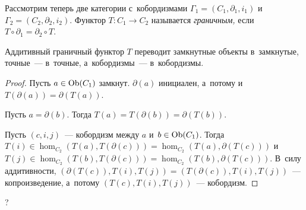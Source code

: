 \documentclass{article}
\begin{document}
Рассмотрим теперь две категории с~кобордизмами $\Gamma_1 = (C_1, \partial_1, i_1)$ и~$\Gamma_2 = (C_2, \partial_2, i_2)$.
Функтор $T : C_1 \rightarrow C_2$ называется \textit{граничным,} если $T \circ \partial_1 = \partial_2 \circ T$.

\begin{lemma*}
    Аддитивный граничный функтор $T$ переводит замкнутные объекты в~замкнутые, точные~— в~точные, а~кобордизмы~— в~кобордизмы.
\end{lemma*}

\begin{proof}
    Пусть $a \in \mathrm{Ob}(C_1)$ замкнут. $\partial(a)$ инициален, а~потому и~$T(\partial(a)) = \partial(T(a))$.

    Пусть $a = \partial(b)$. Тогда $T(a) = T(\partial(b)) = \partial(T(b))$.

    Пусть $(c, i, j)$~— кобордизм между $a$ и~$b \in \mathrm{Ob}(C_1)$.
    Тогда $T(i) \in \hom_{C_2}(T(a), T(\partial(c))) = \hom_{C_2}(T(a), \partial(T(c)))$
    и~$T(j) \in \hom_{C_2}(T(b), T(\partial(c))) = \hom_{C_2}(T(b), \partial(T(c)))$.
    В~силу аддитивности, $(\partial(T(c)), T(i), T(j)) = (T(\partial(c)), T(i), T(j))$~— копроизведение,
    а~потому $(T(c), T(i), T(j))$~— кобордизм.
\end{proof}

?

\pagebreak
\end{document}
